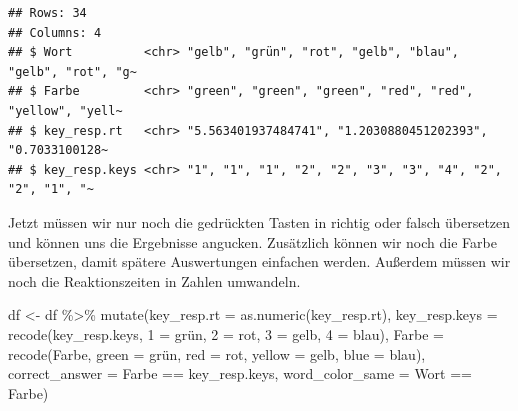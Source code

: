 \documentclass[
]{book}
\newenvironment{Shaded}{\begin{snugshade}}{\end{snugshade}}
\newcommand{\AttributeTok}[1]{\textcolor[rgb]{0.77,0.63,0.00}{#1}}
\newcommand{\FunctionTok}[1]{\textcolor[rgb]{0.00,0.00,0.00}{#1}}
\newcommand{\NormalTok}[1]{#1}
\newcommand{\OtherTok}[1]{\textcolor[rgb]{0.56,0.35,0.01}{#1}}
\newcommand{\SpecialCharTok}[1]{\textcolor[rgb]{0.00,0.00,0.00}{#1}}
\newcommand{\StringTok}[1]{\textcolor[rgb]{0.31,0.60,0.02}{#1}}
\begin{document}
\begin{verbatim}
## Rows: 34
## Columns: 4
## $ Wort          <chr> "gelb", "grün", "rot", "gelb", "blau", "gelb", "rot", "g~
## $ Farbe         <chr> "green", "green", "green", "red", "red", "yellow", "yell~
## $ key_resp.rt   <chr> "5.563401937484741", "1.2030880451202393", "0.7033100128~
## $ key_resp.keys <chr> "1", "1", "1", "2", "2", "3", "3", "4", "2", "2", "1", "~
\end{verbatim}

Jetzt müssen wir nur noch die gedrückten Tasten in richtig oder falsch übersetzen und können uns die Ergebnisse angucken. Zusätzlich können wir noch die Farbe übersetzen, damit spätere Auswertungen einfachen werden.
Außerdem müssen wir noch die Reaktionszeiten in Zahlen umwandeln.

\begin{Shaded}
\begin{Highlighting}[]
\NormalTok{df }\OtherTok{\textless{}{-}}\NormalTok{ df }\SpecialCharTok{\%\textgreater{}\%} 
  \FunctionTok{mutate}\NormalTok{(}\AttributeTok{key\_resp.rt =} \FunctionTok{as.numeric}\NormalTok{(key\_resp.rt),}
         \AttributeTok{key\_resp.keys =} \FunctionTok{recode}\NormalTok{(key\_resp.keys,}
                                \StringTok{\textquotesingle{}1\textquotesingle{}} \OtherTok{=} \StringTok{\textquotesingle{}grün\textquotesingle{}}\NormalTok{,}
                                \StringTok{\textquotesingle{}2\textquotesingle{}} \OtherTok{=} \StringTok{\textquotesingle{}rot\textquotesingle{}}\NormalTok{,}
                                \StringTok{\textquotesingle{}3\textquotesingle{}} \OtherTok{=} \StringTok{\textquotesingle{}gelb\textquotesingle{}}\NormalTok{,}
                                \StringTok{\textquotesingle{}4\textquotesingle{}} \OtherTok{=} \StringTok{\textquotesingle{}blau\textquotesingle{}}\NormalTok{),}
         \AttributeTok{Farbe =} \FunctionTok{recode}\NormalTok{(Farbe,}
                        \StringTok{\textquotesingle{}green\textquotesingle{}} \OtherTok{=} \StringTok{\textquotesingle{}grün\textquotesingle{}}\NormalTok{,}
                        \StringTok{\textquotesingle{}red\textquotesingle{}} \OtherTok{=} \StringTok{\textquotesingle{}rot\textquotesingle{}}\NormalTok{,}
                        \StringTok{\textquotesingle{}yellow\textquotesingle{}} \OtherTok{=} \StringTok{\textquotesingle{}gelb\textquotesingle{}}\NormalTok{,}
                        \StringTok{\textquotesingle{}blue\textquotesingle{}} \OtherTok{=} \StringTok{\textquotesingle{}blau\textquotesingle{}}\NormalTok{),}
         \AttributeTok{correct\_answer =}\NormalTok{ Farbe }\SpecialCharTok{==}\NormalTok{ key\_resp.keys,}
         \AttributeTok{word\_color\_same =}\NormalTok{ Wort }\SpecialCharTok{==}\NormalTok{ Farbe)}
\end{Highlighting}
\end{Shaded}
\end{document}
